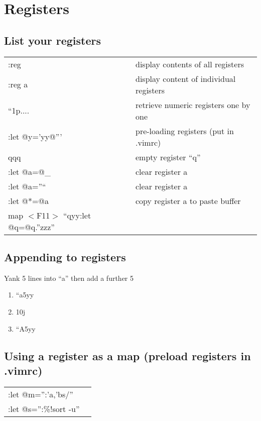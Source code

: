 \section{Registers}

\subsection{List your registers}
\begin{center}
\begin{longtable}{l|l}
:reg & display contents of all registers\\
:reg a & display content of individual registers\\
``1p.... & retrieve numeric registers one by one\\
:let @y='yy@''' & pre-loading registers (put in .vimrc)\\
qqq & empty register ``q''\\
:let @a=@\_ & clear register a\\
:let @a=''`` & clear register a\\
:let @*=@a & copy register a to paste buffer\\
map $<$F11$>$ ``qyy:let @q=@q.''zzz''
\end{longtable}
\end{center}

\subsection{Appending to registers}

Yank 5 lines into ``a'' then add a further 5\\
\begin{enumerate}
\item ``a5yy
\item 10j
\item ``A5yy
\end{enumerate}

\subsection{Using a register as a map (preload registers in .vimrc)}
\begin{center}
\begin{longtable}{l|l}
 :let @m='':'a,'bs/''\\
 :let @s='':\%!sort -u''
 \end{longtable}
\end{center}


